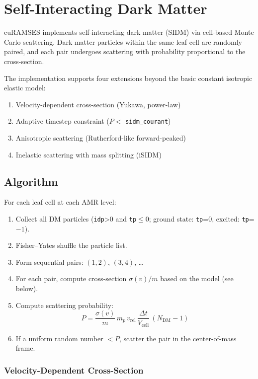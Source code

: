 \documentclass[11pt,fleqn]{book}
\begin{document}
\chapter{Self-Interacting Dark Matter}
\label{ch:sidm}

cuRAMSES implements self-interacting dark matter (SIDM) via cell-based
Monte Carlo scattering.  Dark matter particles within the same leaf cell
are randomly paired, and each pair undergoes scattering
with probability proportional to the cross-section.

The implementation supports four extensions beyond the basic constant
isotropic elastic model:
\begin{enumerate}[nosep]
  \item Velocity-dependent cross-section (Yukawa, power-law)
  \item Adaptive timestep constraint ($P < $ \texttt{sidm\_courant})
  \item Anisotropic scattering (Rutherford-like forward-peaked)
  \item Inelastic scattering with mass splitting (iSIDM)
\end{enumerate}

\section{Algorithm}

For each leaf cell at each AMR level:
\begin{enumerate}[nosep]
  \item Collect all DM particles (\texttt{idp}>0 and \texttt{tp}$\le$0; ground state: \texttt{tp}=0, excited: \texttt{tp}=$-1$).
  \item Fisher--Yates shuffle the particle list.
  \item Form sequential pairs: $(1,2)$, $(3,4)$, \ldots
  \item For each pair, compute cross-section $\sigma(v)/m$ based on the model (see below).
  \item Compute scattering probability:
    \[
      P = \frac{\sigma(v)}{m}\,m_p\,v_{\mathrm{rel}}\,\frac{\Delta t}{V_{\mathrm{cell}}}\,(N_{\mathrm{DM}}-1)
    \]
  \item If a uniform random number $< P$, scatter the pair in the center-of-mass frame.
\end{enumerate}

\subsection{Velocity-Dependent Cross-Section}
\end{document}
